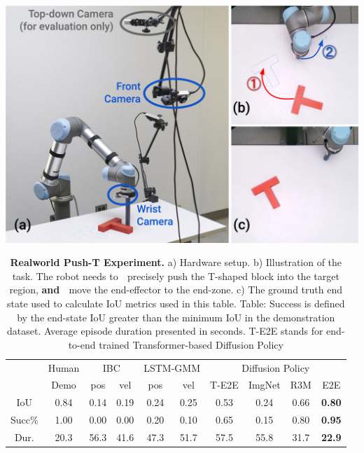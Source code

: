 \documentclass[Afour,sageh,times]{sagej}
\begin{document}
\begin{table}[t]
\centering
\includegraphics[width=0.9\linewidth]{figure/real_task_setup.pdf}

\vspace{2mm}
\setlength\tabcolsep{1.2pt}
\small
\begin{tabular}{c|c|cc|cc|cccc}
\toprule
       & Human & \multicolumn{2}{c|}{IBC} & \multicolumn{2}{c|}{LSTM-GMM} & \multicolumn{4}{c}{Diffusion Policy}     \\
       & Demo  & pos        & vel        & pos          & vel         & T-E2E & ImgNet & R3M & E2E         \\
\midrule
IoU      & 0.84  & 0.14       & 0.19       & 0.24         & 0.25        & 0.53  & 0.24     & 0.66  & \textbf{0.80} \\
Succ\%   & 1.00  & 0.00       & 0.00       & 0.20         & 0.10        & 0.65  & 0.15     & 0.80  & \textbf{0.95} \\
Dur. & 20.3  & 56.3       & 41.6       & 47.3         & 51.7        & 57.5  & 55.8     & 31.7  & \textbf{22.9} \\
\bottomrule
\end{tabular}

\caption{\textbf{Realworld Push-T Experiment.} 
\label{tab:real_pusht}
a) Hardware setup.  
b) Illustration of the task. The robot needs to \textcircled{} precisely push the T-shaped block into the target region, \textbf{and} \textcircled{} move the end-effector to the end-zone. 
c) The ground truth end state used to calculate IoU metrics used in this table. Table: Success is defined by the end-state IoU greater than the minimum IoU in the demonstration dataset. Average episode duration presented in seconds. T-E2E stands for end-to-end trained Transformer-based Diffusion Policy}

\vspace{-4mm}
\end{table}
\end{document}
